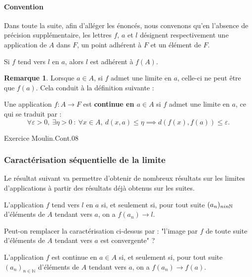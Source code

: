 \documentclass[french]{article}
\newcommand{\N}{\mathbb{N}}
\theoremstyle{plain}
\theoremstyle{definition}
\newtheorem*{rmq}{Remarque}
\theoremstyle{remark}
\begin{document}
\paragraph{Convention} Dans toute la suite, afin d'alléger les énoncés, nous convenons qu'en l'absence de précision supplémentaire, les lettres $f$, $a$ et $l$ désignent respectivement une application de $A$ dans $F$, un point adhérent à $F$ et un élément de $F$.

\begin{lem}%
	Si $f$ tend vers $l$ en $a$, alors $l$ est adhérent à $f(A)$.
\end{lem}

\begin{rmq}
	Lorsque $a\in A$, si $f$ admet une limite en $a$, celle-ci ne peut être que $f(a)$. Cela conduit à la définition suivante :
\end{rmq}

\begin{dfn}
	Une application $f:A\to F$ est \textbf{continue en $a\in A$} si $f$ admet une limite en $a$, ce qui se traduit par : $$\forall\varepsilon>0,\ \exists\eta>0\ :\ \forall x\in A,\ d(x,a)\leqslant\eta\implies d(f(x),f(a))\leqslant\varepsilon.$$
\end{dfn}

Exercice Moulin.Cont.08

\subsubsection*{Caractérisation séquentielle de la limite}

Le résultat suivant va permettre d'obtenir de nombreux résultats sur les limites d'applications à partir des résultats déjà obtenus sur les suites.

\begin{prop}%
	L'application $f$ tend vers $l$ en $a$ si, et seulement si, pour tout suite $(a_n)_{n\\in\N}$ d'éléments de $A$ tendant vers $a$, on a $f(a_n)\to l$.
\end{prop}

\begin{exo}
	Peut-on remplacer la caractérisation ci-dessus par : "l'image par $f$ de toute suite d'éléments de $A$ tendant vers $a$ est convergente" ?
\end{exo}

\begin{cor}%
	L'application $f$ est continue en $a\in A$ si, et seulement si, pour tout suite $(a_n)_{n\in\N}$ d'éléments de $A$ tendant vers $a$, on a $f(a_n)\to f(a)$.
\end{cor}
\end{document}
